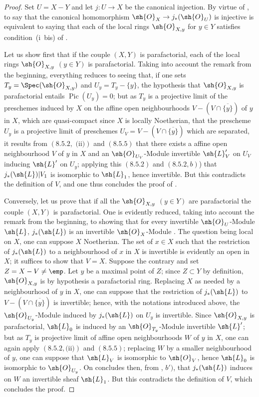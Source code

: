 \begin{proof}
Set $U=X-Y$ and let $j:U\to X$ be the canonical injection.
By virtue of , to say that the canonical homomorphism $\sh{O}_X\to j_*(\sh{O}_U)$ is injective is equivalent to saying that each of the local rings $\sh{O}_{X,y}$ for $y\in Y$ satisfies condition~(i~bis) of .

Let us show first that if the couple $(X,Y)$ is parafactorial, each of the local rings $\sh{O}_{X,y}$ $(y\in Y)$ is parafactorial.
Taking into account the remark from the beginning, everything reduces to seeing that, if one sets $T_y=\Spec(\sh{O}_{X,y})$ and $U_y=T_y-\{y\}$, the hypothesis that $\sh{O}_{X,y}$ is parafactorial entails $\operatorname{Pic}(U_y)=0$; but as $T_y$ is a projective limit of the preschemes induced by $X$ on the affine open neighbourhoods $V-(V\cap\overline{\{y\}})$ of $y$ in $X$, which are quasi-compact since $X$ is locally Noetherian, that the prescheme $U_y$ is a projective limit of preschemes $U_V=V-(V\cap\overline{\{y\}})$ which are separated, it results from $(8.5.2,\text{ (ii)})$ and $(8.5.5)$ that there exists a affine open neighbourhood $V$ of $y$ in $X$ and an $\sh{O}_{U_V}$-Module invertible $\sh{L}'_V$ on $U_V$ inducing $\sh{L}'$ on $U_y$; applying this $(8.5.2)$ and $(8.5.2, b)$) that $j_*(\sh{L})|V_1$ is isomorphic to $\sh{L}_1$, hence invertible.
But this contradicts the definition of $V$, and one thus concludes the proof of .

Conversely, let us prove that if all the $\sh{O}_{X,y}$ $(y\in Y)$ are parafactorial the couple $(X,Y)$ is parafactorial.
One is evidently reduced, taking into account the remark from the beginning, to showing that for every invertible $\sh{O}_U$-Module $\sh{L}$, $j_*(\sh{L})$ is an invertible $\sh{O}_X$-Module .
The question being local on $X$, one can suppose $X$ Noetherian.
The set of $x\in X$ such that the restriction of $j_*(\sh{L})$ to a neighbourhood of $x$ in $X$ is invertible is evidently an open in $X$; it suffices to show that $V=X$.
Suppose the contrary and set $Z=X-V\neq\emp$.
Let $y$ be a maximal point of $Z$; since $Z\subset Y$ by definition, $\sh{O}_{X,y}$ is by hypothesis a parafactorial ring.
Replacing $X$ as needed by a neighbourhood of $y$ in $X$, one can suppose that the restriction of $j_*(\sh{L})$ to $V-(V\cap\overline{\{y\}})$ is invertible; hence, with the notations introduced above, the $\sh{O}_{U_y}$-Module induced by $j_*(\sh{L})$ on $U_y$ is invertible.
Since $\sh{O}_{X,y}$ is parafactorial, $\sh{L}_0$ is induced by an $\sh{O}_{T_y}$-Module invertible $\sh{L}'$; but as $T_y$ is projective limit of affine open neighbourhoods $W$ of $y$ in $X$, one can again apply $(8.5.2, \text{(ii)})$ and $(8.5.5)$; replacing $W$ by a smaller neighbourhood of $y$, one can suppose that $\sh{L}_V$ is isomorphic to $\sh{O}_V$, hence $\sh{L}_0$ is isomorphic to $\sh{O}_{U_y}$.
On concludes then, from , $b')$, that $j_*(\sh{L})$ induces on $W$ an invertible sheaf $\sh{L}_1$. But this contradicts the definition of $V$, which concludes the proof.
\end{proof}

